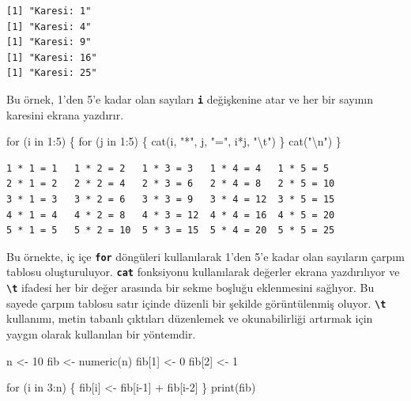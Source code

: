 \documentclass[
  letterpaper,
  DIV=11,
  numbers=noendperiod]{scrreprt}
\newenvironment{Shaded}{\begin{snugshade}}{\end{snugshade}}
\newcommand{\ControlFlowTok}[1]{\textcolor[rgb]{0.00,0.23,0.31}{#1}}
\newcommand{\DecValTok}[1]{\textcolor[rgb]{0.68,0.00,0.00}{#1}}
\newcommand{\FunctionTok}[1]{\textcolor[rgb]{0.28,0.35,0.67}{#1}}
\newcommand{\NormalTok}[1]{\textcolor[rgb]{0.00,0.23,0.31}{#1}}
\newcommand{\OtherTok}[1]{\textcolor[rgb]{0.00,0.23,0.31}{#1}}
\newcommand{\SpecialCharTok}[1]{\textcolor[rgb]{0.37,0.37,0.37}{#1}}
\newcommand{\StringTok}[1]{\textcolor[rgb]{0.13,0.47,0.30}{#1}}
\begin{document}
\begin{verbatim}
[1] "Karesi: 1"
[1] "Karesi: 4"
[1] "Karesi: 9"
[1] "Karesi: 16"
[1] "Karesi: 25"
\end{verbatim}

Bu örnek, 1'den 5'e kadar olan sayıları \textbf{\texttt{i}} değişkenine
atar ve her bir sayının karesini ekrana yazdırır.

\begin{Shaded}
\begin{Highlighting}[]
\ControlFlowTok{for}\NormalTok{ (i }\ControlFlowTok{in} \DecValTok{1}\SpecialCharTok{:}\DecValTok{5}\NormalTok{) \{}
  \ControlFlowTok{for}\NormalTok{ (j }\ControlFlowTok{in} \DecValTok{1}\SpecialCharTok{:}\DecValTok{5}\NormalTok{) \{}
    \FunctionTok{cat}\NormalTok{(i, }\StringTok{"*"}\NormalTok{, j, }\StringTok{"="}\NormalTok{, i}\SpecialCharTok{*}\NormalTok{j, }\StringTok{"}\SpecialCharTok{\textbackslash{}t}\StringTok{"}\NormalTok{)}
\NormalTok{  \}}
  \FunctionTok{cat}\NormalTok{(}\StringTok{"}\SpecialCharTok{\textbackslash{}n}\StringTok{"}\NormalTok{)}
\NormalTok{\}}
\end{Highlighting}
\end{Shaded}

\begin{verbatim}
1 * 1 = 1   1 * 2 = 2   1 * 3 = 3   1 * 4 = 4   1 * 5 = 5   
2 * 1 = 2   2 * 2 = 4   2 * 3 = 6   2 * 4 = 8   2 * 5 = 10  
3 * 1 = 3   3 * 2 = 6   3 * 3 = 9   3 * 4 = 12  3 * 5 = 15  
4 * 1 = 4   4 * 2 = 8   4 * 3 = 12  4 * 4 = 16  4 * 5 = 20  
5 * 1 = 5   5 * 2 = 10  5 * 3 = 15  5 * 4 = 20  5 * 5 = 25  
\end{verbatim}

Bu örnekte, iç içe \textbf{\texttt{for}} döngüleri kullanılarak 1'den
5'e kadar olan sayıların çarpım tablosu oluşturuluyor.
\textbf{\texttt{cat}} fonksiyonu kullanılarak değerler ekrana
yazdırılıyor ve \textbf{\texttt{\textbackslash{}t}} ifadesi her bir
değer arasında bir sekme boşluğu eklenmesini sağlıyor. Bu sayede çarpım
tablosu satır içinde düzenli bir şekilde görüntülenmiş oluyor.
\textbf{\texttt{\textbackslash{}t}} kullanımı, metin tabanlı çıktıları
düzenlemek ve okunabilirliği artırmak için yaygın olarak kullanılan bir
yöntemdir.

\begin{Shaded}
\begin{Highlighting}[]
\NormalTok{n }\OtherTok{\textless{}{-}} \DecValTok{10}
\NormalTok{fib }\OtherTok{\textless{}{-}} \FunctionTok{numeric}\NormalTok{(n)}
\NormalTok{fib[}\DecValTok{1}\NormalTok{] }\OtherTok{\textless{}{-}} \DecValTok{0}
\NormalTok{fib[}\DecValTok{2}\NormalTok{] }\OtherTok{\textless{}{-}} \DecValTok{1}

\ControlFlowTok{for}\NormalTok{ (i }\ControlFlowTok{in} \DecValTok{3}\SpecialCharTok{:}\NormalTok{n) \{}
\NormalTok{  fib[i] }\OtherTok{\textless{}{-}}\NormalTok{ fib[i}\DecValTok{{-}1}\NormalTok{] }\SpecialCharTok{+}\NormalTok{ fib[i}\DecValTok{{-}2}\NormalTok{]}
\NormalTok{\}}
\FunctionTok{print}\NormalTok{(fib)}
\end{Highlighting}
\end{Shaded}
\end{document}
